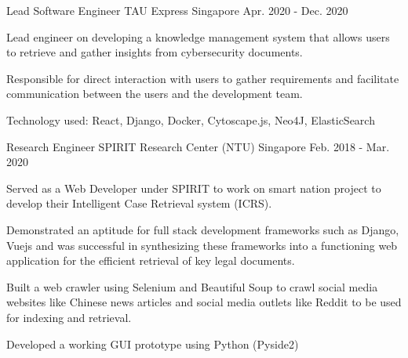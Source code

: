 \begin{cventries}
  \cventry
    {Lead Software Engineer} %
    {TAU Express} %
    {Singapore} %
    {Apr. 2020 - Dec. 2020} %
    {
      \begin{cvitems} %
        \item {Lead engineer on developing a knowledge management system that allows users to retrieve and gather insights from cybersecurity documents.}
        \item {Responsible for direct interaction with users to gather requirements and facilitate communication between the users and the development team.}
        \item {Technology used: React, Django, Docker, Cytoscape.js, Neo4J, ElasticSearch}
     \end{cvitems}
    }

  \cventry
    {Research Engineer} %
    {SPIRIT Research Center (NTU)} %
    {Singapore} %
    {Feb. 2018 - Mar. 2020} %
    {
      \begin{cvitems} %
        \item {Served as a Web Developer under SPIRIT to work on smart nation project to develop their Intelligent Case Retrieval system (ICRS).}
        \item {Demonstrated an aptitude for full stack development frameworks such as Django, Vuejs and was successful in synthesizing these frameworks into a functioning web application for the efficient retrieval of key legal documents.}
        \item {Built a web crawler using Selenium and Beautiful Soup to crawl social media websites like Chinese news articles and social media outlets like Reddit to be used for indexing and retrieval.}
        \item {Developed a working GUI prototype using Python (Pyside2) }
      \end{cvitems}
    }



\end{cventries}
